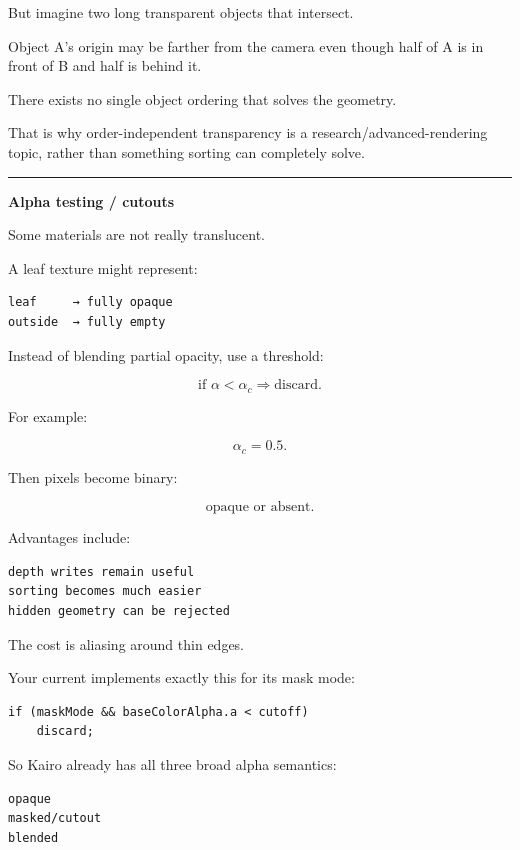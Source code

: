 But imagine two long transparent objects that intersect.

Object A's origin may be farther from the camera even though half of A is in front of B and half is behind it.

There exists no single object ordering that solves the geometry.

That is why order-independent transparency is a research/advanced-rendering topic, rather than something sorting can completely solve.

\begin{center}\rule{0.5\linewidth}{0.5pt}\end{center}

\textbf{Alpha testing / cutouts}

Some materials are not really translucent.

A leaf texture might represent:

\begin{verbatim}
leaf     → fully opaque
outside  → fully empty
\end{verbatim}

Instead of blending partial opacity, use a threshold:

\[
\text{if }\alpha < \alpha_c
\Rightarrow
\text{discard}.
\]

For example:

\[
\alpha_c=0.5.
\]

Then pixels become binary:

\[
\text{opaque or absent}.
\]

Advantages include:

\begin{verbatim}
depth writes remain useful
sorting becomes much easier
hidden geometry can be rejected
\end{verbatim}

The cost is aliasing around thin edges.

Your current  implements exactly this for its mask mode:

\begin{verbatim}
if (maskMode && baseColorAlpha.a < cutoff)
    discard;
\end{verbatim}

So Kairo already has all three broad alpha semantics:

\begin{verbatim}
opaque
masked/cutout
blended
\end{verbatim}


